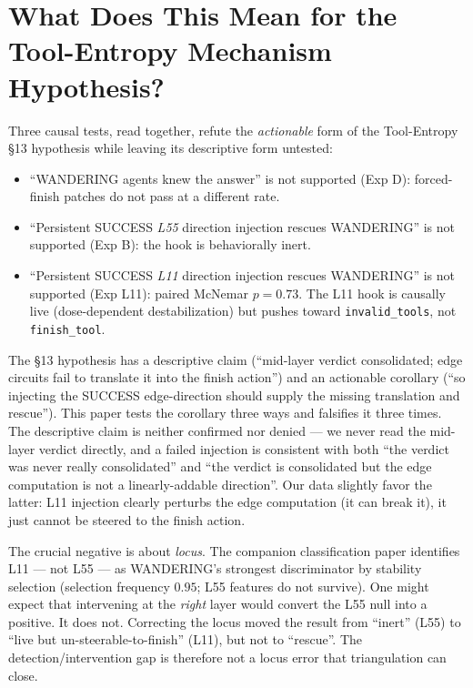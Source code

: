 \documentclass[11pt]{article}
\begin{document}
\section{What Does This Mean for the Tool-Entropy Mechanism Hypothesis?}\label{sec:mechanism_implications}

Three causal tests, read together, refute the \emph{actionable} form of the Tool-Entropy \S13 hypothesis while leaving its descriptive form untested:

\begin{itemize}
\item ``WANDERING agents knew the answer'' is not supported (Exp D): forced-finish patches do not pass at a different rate.
\item ``Persistent SUCCESS \emph{L55} direction injection rescues WANDERING'' is not supported (Exp B): the hook is behaviorally inert.
\item ``Persistent SUCCESS \emph{L11} direction injection rescues WANDERING'' is not supported (Exp L11): paired McNemar $p=0.73$. The L11 hook is causally live (dose-dependent destabilization) but pushes toward \texttt{invalid\_tools}, not \texttt{finish\_tool}.
\end{itemize}

The \S13 hypothesis has a descriptive claim (``mid-layer verdict consolidated; edge circuits fail to translate it into the finish action'') and an actionable corollary (``so injecting the SUCCESS edge-direction should supply the missing translation and rescue''). This paper tests the corollary three ways and falsifies it three times. The descriptive claim is neither confirmed nor denied --- we never read the mid-layer verdict directly, and a failed injection is consistent with both ``the verdict was never really consolidated'' and ``the verdict is consolidated but the edge computation is not a linearly-addable direction''. Our data slightly favor the latter: L11 injection clearly perturbs the edge computation (it can break it), it just cannot be steered to the finish action.

The crucial negative is about \emph{locus}. The companion classification paper \cite{multichannel_2026} identifies L11 --- not L55 --- as WANDERING's strongest discriminator by stability selection (selection frequency $0.95$; L55 features do not survive). One might expect that intervening at the \emph{right} layer would convert the L55 null into a positive. It does not. Correcting the locus moved the result from ``inert'' (L55) to ``live but un-steerable-to-finish'' (L11), but not to ``rescue''. The detection/intervention gap is therefore not a locus error that triangulation can close.
\end{document}

